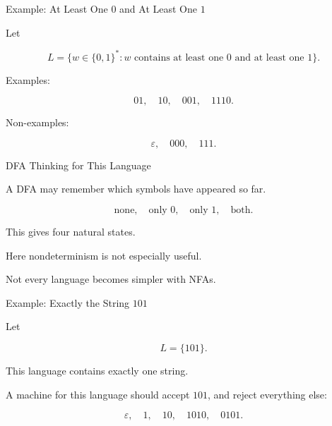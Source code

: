 \documentclass[10pt,aspectratio=169]{beamer}
\newcommand{\eps}{\varepsilon}
\begin{document}
\begin{frame}{Example: At Least One \(0\) and At Least One \(1\)}

Let

\[
L=\{w\in\{0,1\}^*: w \text{ contains at least one }0
\text{ and at least one }1\}.
\]

\vspace{1em}

Examples:

\[
01,\quad 10,\quad 001,\quad 1110.
\]

Non-examples:

\[
\eps,\quad 000,\quad 111.
\]

\end{frame}

\begin{frame}{DFA Thinking for This Language}

A DFA may remember which symbols have appeared so far.

\[
\text{none},\quad
\text{only 0},\quad
\text{only 1},\quad
\text{both}.
\]

\vspace{1em}

This gives four natural states.

\pause

Here nondeterminism is not especially useful.

Not every language becomes simpler with NFAs.

\end{frame}

\begin{frame}{Example: Exactly the String \(101\)}

Let

\[
L=\{101\}.
\]

\vspace{1em}

This language contains exactly one string.

\pause

A machine for this language should accept \(101\), and reject everything else:

\[
\eps,\quad 1,\quad 10,\quad 1010,\quad 0101.
\]

\end{frame}
\end{document}
